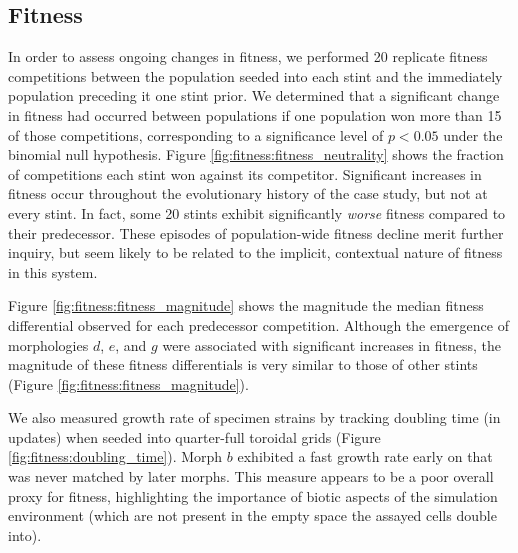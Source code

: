 
\subsection{Fitness}



In order to assess ongoing changes in fitness, we performed 20 replicate fitness competitions between the population seeded into each stint and the immediately population preceding it one stint prior.
We determined that a significant change in fitness had occurred between populations if one population won more than 15 of those competitions, corresponding to a significance level of $p < 0.05$ under the binomial null hypothesis.
Figure \ref{fig:fitness:fitness_neutrality} shows the fraction of competitions each stint won against its competitor.
Significant increases in fitness occur throughout the evolutionary history of the case study, but not at every stint.
In fact, some 20 stints exhibit significantly \textit{worse} fitness compared to their predecessor.
These episodes of population-wide fitness decline merit further inquiry, but seem likely to be related to the implicit, contextual nature of fitness in this system.

Figure \ref{fig:fitness:fitness_magnitude} shows the magnitude the median fitness differential observed for each predecessor competition.
Although the emergence of morphologies $d$, $e$, and $g$ were associated with significant increases in fitness, the magnitude of these fitness differentials is very similar to those of other stints (Figure \ref{fig:fitness:fitness_magnitude}).

We also measured growth rate of specimen strains by tracking doubling time (in updates) when seeded into quarter-full toroidal grids (Figure \ref{fig:fitness:doubling_time}).
Morph $b$ exhibited a fast growth rate early on that was never matched by later morphs.
This measure appears to be a poor overall proxy for fitness, highlighting the importance of biotic aspects of the simulation environment (which are not present in the empty space the assayed cells double into).


